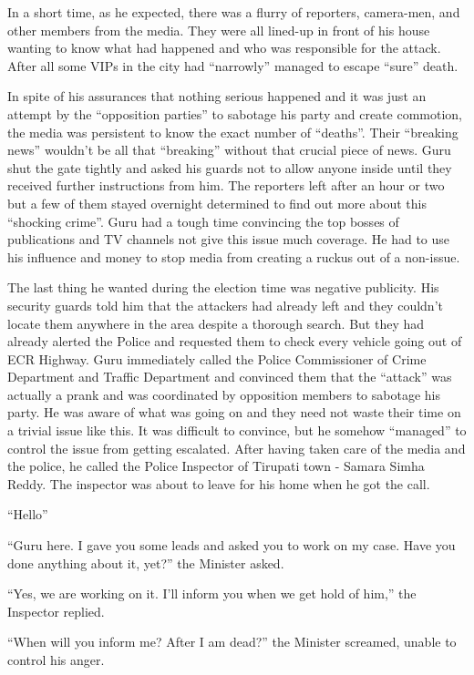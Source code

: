 In a short time, as he expected, there was a flurry of reporters, camera-men,
and other members from the media. They were all lined-up in front of his house
wanting to know what had happened and who was responsible for the attack. After
all some VIPs in the city had “narrowly” managed to escape “sure” death.

In spite of his assurances that nothing serious happened and it was just an
attempt by the “opposition parties” to sabotage his party and create commotion,
the media was persistent to know the exact number of “deaths”. Their “breaking
news” wouldn't be all that “breaking” without that crucial piece of news. Guru
shut the gate tightly and asked his guards not to allow anyone inside until they
received further instructions from him. The reporters left after an hour or two
but a few of them stayed overnight determined to find out more about this
“shocking crime”. Guru had a tough time convincing the top bosses of
publications and TV channels not give this issue much coverage. He had to use
his influence and money to stop media from creating a ruckus out of a non-issue.

The last thing he wanted during the election time was negative publicity. His
security guards told him that the attackers had already left and they couldn't
locate them anywhere in the area despite a thorough search. But they had already
alerted the Police and requested them to check every vehicle going out of ECR
Highway. Guru immediately called the Police Commissioner of Crime Department and
Traffic Department and convinced them that the “attack” was actually a prank and
was coordinated by opposition members to sabotage his party. He was aware of
what was going on and they need not waste their time on a trivial issue like
this. It was difficult to convince, but he somehow “managed” to control the
issue from getting escalated.
After having taken care of the media and the police, he called the Police
Inspector of Tirupati town - Samara Simha Reddy. The inspector was about to
leave for his home when he got the call.

“Hello”

“Guru here. I gave you some leads and asked you to work on my case. Have you
done anything about it, yet?” the Minister asked.

“Yes, we are working on it. I'll inform you when we get hold of him,” the
Inspector replied.

“When will you inform me? After I am dead?” the Minister screamed, unable to
control his anger.

